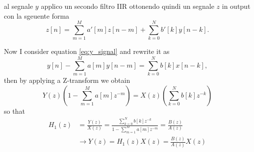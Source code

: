 al segnale $y$ applico un secondo filtro IIR ottonendo quindi un segnale $z$ in output con la sgeuente forma 
\begin{equation}\label{eq:z_signal}
    z[n] = \sum_{m=1}^{M} a'[m]z[n-m] + \sum_{k=0}^{N} b'[k] y[n-k].
\end{equation}

Now I consider equation \ref{eq:y_signal} and rewrite it as
\begin{equation}\label{eq:y_signal1}
    y[n] - \sum_{m=1}^{M} a[m]y[n-m] = \sum_{k=0}^{N} b[k] x[n-k],
\end{equation} 
then by applying a Z-transform we obtain
\begin{equation}\label{eq:y_signal_transform}
    Y(z)\left(1 - \sum_{m=1}^{M} a[m] z^{-m} \right) = X(z) \left( \sum_{k=0}^{N} b[k] z^{-k} \right)
\end{equation}
so that 
\begin{align}
    H_1(z) &= \frac{Y(z)}{X(z)} = \frac{\sum_{k=0}^{N} b[k] z^{-k}}{1 - \sum_{m=1}^{M} a[m] z^{-m}} = \frac{B(z)}{A(z)} \\
    & \rightarrow Y(z) = H_1(z)X(z) = \frac{B(z)}{A(z)}X(z) \\ \label{eq:transfer1}
\end{align}

